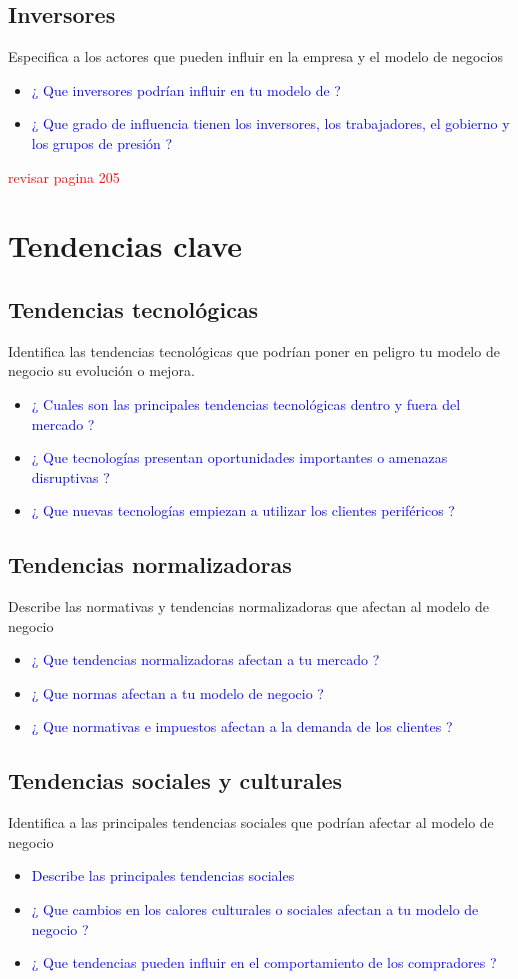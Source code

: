 \documentclass[11pt]{book}
\begin{document}
\subsection{Inversores}
Especifica a los actores que pueden influir en la empresa y el modelo de negocios
\begin{itemize}
\item\textcolor{blue}{¿ Que inversores podrían influir en tu modelo de  ?}
\item\textcolor{blue}{¿ Que grado de influencia tienen los inversores, los trabajadores, el gobierno y los grupos de presión ?}
\end{itemize}
\textcolor{red}{revisar pagina 205}
\section{Tendencias clave}
\subsection{Tendencias tecnológicas}
Identifica las tendencias tecnológicas que podrían poner en peligro tu modelo de negocio su evolución o mejora.
\begin{itemize}
\item\textcolor{blue}{¿ Cuales son las principales tendencias tecnológicas dentro y fuera del mercado ?}
\item\textcolor{blue}{ ¿ Que tecnologías presentan oportunidades importantes o amenazas disruptivas ? }
\item\textcolor{blue}{ ¿ Que nuevas tecnologías empiezan a utilizar los clientes periféricos ? }
\end{itemize}
\subsection{Tendencias normalizadoras}
Describe las normativas y tendencias normalizadoras que afectan al modelo de negocio
\begin{itemize}
\item\textcolor{blue}{ ¿ Que tendencias normalizadoras afectan a tu mercado ? }
\item\textcolor{blue}{ ¿ Que normas afectan a tu modelo de negocio ? }
\item\textcolor{blue}{ ¿ Que normativas e impuestos afectan a la demanda de los clientes ? }
\end{itemize}
\subsection{Tendencias sociales y culturales}
Identifica a las principales tendencias sociales que podrían afectar al modelo de negocio
\begin{itemize}
\item\textcolor{blue}{ Describe las principales tendencias sociales  }
\item\textcolor{blue}{ ¿ Que cambios en los calores culturales o sociales afectan a tu modelo de negocio ? }
\item\textcolor{blue}{ ¿ Que tendencias pueden influir en el comportamiento de los compradores ? }
\end{itemize}
\end{document}
